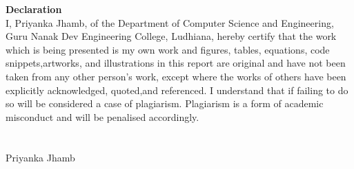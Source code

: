 {\Huge \centering \textbf{Declaration}\\}
\vspace{0.5in}
\noindent I, Priyanka Jhamb, of the Department of Computer Science and Engineering, Guru Nanak Dev Engineering College, Ludhiana, hereby certify that the work which is being presented is my own work and figures, tables, equations, code snippets,artworks, and illustrations in this report are original and have not been taken from any other person's  work,  except  where  the  works  of  others  have  been  explicitly  acknowledged,  quoted,and  referenced.  I  understand  that  if  failing  to  do  so  will  be  considered  a  case  of  plagiarism. Plagiarism is a form of academic misconduct and will be penalised accordingly.
\\\\\\
Priyanka Jhamb
\newpage
